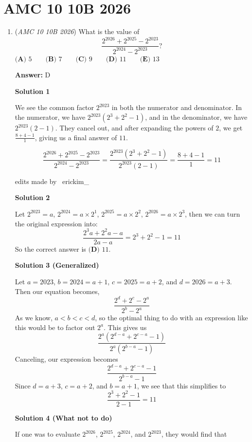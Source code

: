 \section{AMC 10 10B 2026}
        \begin{enumerate}
        	\item (\textit{AMC 10 10B 2026}) What is the value of 
 \[\frac{2^{2026}+2^{2025}-2^{2023}}{2^{2024}-2^{2023}}?\]
$\textbf{(A) } 5 \qquad \textbf{(B) } 7 \qquad \textbf{(C) } 9 \qquad \textbf{(D) } 11 \qquad \textbf{(E) } 13$

 \textbf{Answer: }D



\textbf{Solution 1}

We see the common factor $2^{2023}$ in both the numerator and denominator. In the numerator, we have $2^{2023}(2^{3}+2^{2}-1)$, and in the denominator, we have $2^{2023}(2-1)$. They cancel out, and after expanding the powers of $2$, we get $\frac{8+4-1}{1}$, giving us a final answer of $\boxed{11}$.

 
 \[\frac{2^{2026}+2^{2025}-2^{2023}}{2^{2024}-2^{2023}} = \frac{2^{2023}\left(2^3+2^2-1\right)}{2^{2023}\left(2-1\right)} = \frac{8+4-1}{1} = \boxed{11}\]

 edits made by ~erickim\_

 



\textbf{Solution 2}

Let $2^{{2023}}=a$, $2^{{2024}}=a \times 2^{{1}}$, $2^{{2025}}=a \times 2^{{2}}$, $2^{{2026}}=a \times 2^{{3}}$, then we can turn the original expression into: 
 \[\frac{2^{{3}}a+2^{{2}}a-a}{2a-a}=2^{{3}}+2^{{2}}-1=11\]So the correct answer is $\textbf{(D) } 11$.

 



\textbf{Solution 3 (Generalized)}

Let $a=2023$, $b=2024=a+1$, $c=2025=a+2$, and $d=2026=a+3$. Then our equation becomes, 
 \[\frac{2^{d}+2^{c}-2^{a}}{2^b-2^a}\] As we know, $a<b<c<d$, so the optimal thing to do with an expression like this would be to factor out $2^a$. This gives us 
 \[\frac{2^a(2^{d-a}+2^{c-a}-1)}{2^a(2^{b-a}-1)}\] Canceling, our expression becomes 
 \[\frac{2^{d-a}+2^{c-a}-1}{2^{b-a}-1}\] Since $d=a+3$, $c=a+2$, and $b=a+1$, we see that this simplifies to 
 \[\frac{2^3+2^2-1}{2-1}=\boxed{11}\]




\textbf{Solution 4 (What not to do)}

If one was to evaluate $2^{2026}$, $2^{2025}$, $2^{2024}$, and $2^{2023}$, they would find that


\end{enumerate}
